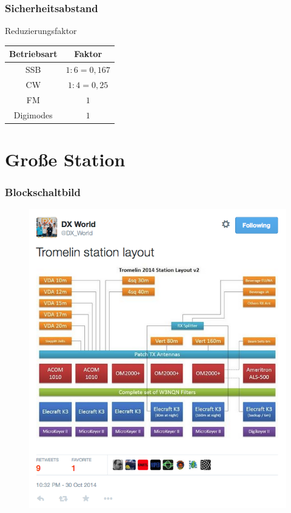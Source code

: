 \begin{frame}
  \frametitle{Sicherheitsabstand}
  \begin{center}
    \begin{block}{Reduzierungsfaktor}
      \begin{center}
        \begin{tabular}{c|c}
          Betriebsart & Faktor \\ \hline \hline
          SSB & $1:6 = 0,167$ \\ \hline
          CW & $1:4 = 0,25$ \\ \hline
          FM & $1$ \\ \hline
          Digimodes & $1$
        \end{tabular}
      \end{center}
    \end{block}
  \end{center}
\end{frame}

\section*{Große Station}

\begin{frame}
  \frametitle{Blockschaltbild}
  \begin{center}
    \begin{figure}
      \includegraphics[width=\textwidth,height=0.75\textheight,keepaspectratio]{a19/BsB.png}
    \end{figure}
  \end{center}
\end{frame}

